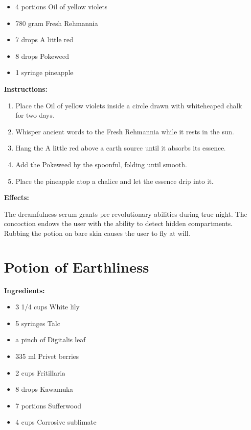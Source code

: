 \documentclass{article}
\begin{document}
\begin{itemize}
  \item 4 portions Oil of yellow violets
  \item 780 gram Fresh Rehmannia
  \item 7 drops A little red
  \item 8 drops Pokeweed
  \item 1 syringe pineapple
\end{itemize}

\textbf{Instructions:}

\begin{enumerate}
  \item Place the Oil of yellow violets inside a circle drawn with whiteheaped chalk for two days.
  \item Whisper ancient words to the Fresh Rehmannia while it rests in the sun.
  \item Hang the A little red above a earth source until it absorbs its essence.
  \item Add the Pokeweed by the spoonful, folding until smooth.
  \item Place the pineapple atop a chalice and let the essence drip into it.
\end{enumerate}

\textbf{Effects:}

The dreamfulness serum grants pre-revolutionary abilities during true night. The concoction endows the user with the ability to detect hidden compartments. Rubbing the potion on bare skin causes the user to fly at will.

\newpage
\section*{Potion of Earthliness}

\textbf{Ingredients:}

\begin{itemize}
  \item 3 1/4 cups White lily
  \item 5 syringes Talc
  \item a pinch of Digitalis leaf
  \item 335 ml Privet berries
  \item 2 cups Fritillaria
  \item 8 drops Kawamuka
  \item 7 portions Sufferwood
  \item 4 cups Corrosive sublimate
\end{itemize}
\end{document}
